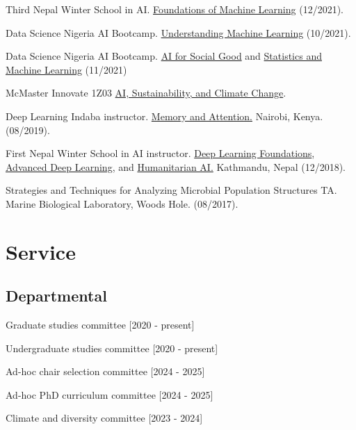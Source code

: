 \documentclass[letterpaper]{article}
\renewenvironment{itemize}{
  \begin{list}{}{
    \setlength{\leftmargin}{1.5em}
  }
}{
  \end{list}
}
\begin{document}
\begin{itemize}
\item Third Nepal Winter School in AI. \href{https://krisrs1128.github.io/winter_school_2021/index.html}{Foundations of Machine Learning} (12/2021).
\item Data Science Nigeria AI Bootcamp. \href{https://drive.google.com/file/d/1bgYQb8z1iCjHyOG1gVWeJJCSPdssndVP/view}{Understanding Machine Learning} (10/2021).
\item Data Science Nigeria AI Bootcamp. \href{https://www.youtube.com/watch?v=7_8DUN-6tpI&}{AI for Social Good} and \href{https://www.youtube.com/watch?v=EefWzpRkIVM}{Statistics and Machine Learning} (11/2021)
\item McMaster Innovate 1Z03 \href{https://docs.google.com/presentation/d/1JWV8_VXYzCzipr6EJZdcdaPY5pz2Cp4F/edit#slide=id.p1}{AI, Sustainability, and Climate Change}.
\item Deep Learning Indaba instructor. \href{https://www.youtube.com/watch?v=9mWYFZwNpis}{Memory and Attention.} Nairobi, Kenya. (08/2019).
\item First Nepal Winter School in AI instructor. \href{https://www.youtube.com/watch?v=3lBMxO2zmGg}{Deep Learning Foundations}, \href{https://www.youtube.com/watch?v=OLaX-jmRUwY}{Advanced Deep Learning}, and \href{https://www.youtube.com/watch?v=RXZyGwa4TpY}{Humanitarian AI.} Kathmandu, Nepal (12/2018).
\item Strategies and Techniques for Analyzing Microbial Population Structures TA. Marine Biological Laboratory, Woods Hole. (08/2017).
\end{itemize}

\section*{Service}

\subsection*{Departmental}

\begin{itemize}
\item Graduate studies committee [2020 - present]
\item Undergraduate studies committee [2020 - present]
\item Ad-hoc chair selection committee [2024 - 2025]
\item Ad-hoc PhD curriculum committee [2024 - 2025]
\item Climate and diversity committee [2023 - 2024]
\end{itemize}
\end{document}
